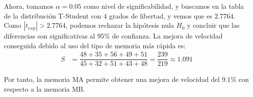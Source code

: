 \begin{ejercicio}
Ahora, tomamos $\alpha=0.05$ como nivel de significabilidad, y buscamos en la tabla de la distribución T-Student con $4$ grados de libertad, y vemos que es $2.7764$. Como $|t_{exp}| > 2.7764$, podemos rechazar la hipótesis nula $H_0$ y concluir que las diferencias son significativas al 95\% de confianza. La mejora de velocidad conseguida debido al uso del tipo de memoria más rápida es:
\begin{align*}
    S &= \dfrac{48 + 35 + 56 + 49 + 51}{45 + 32 + 51 + 43 + 48} = \dfrac{239}{219} \approx 1.091
\end{align*}

Por tanto, la memoria MA permite obtener una mejora de velocidad del $9.1\%$ con respecto a la memoria MB.
\end{ejercicio}

\begin{comment}Sol:
Las diferencias son significativas. La memoria MA permite obtener una mejora de velocidad del 9\% con respecto a la memoria MB.
\end{comment}


